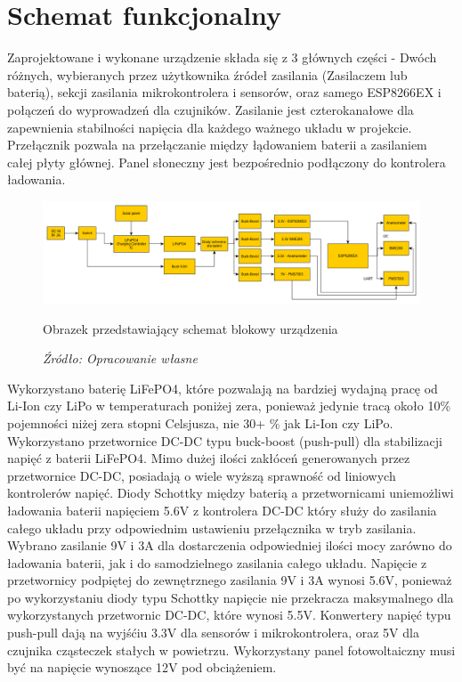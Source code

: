 \documentclass[12pt,a4paper,oneside]{memoir}
\begin{document}
\chapter{Schemat funkcjonalny}
\par Zaprojektowane i wykonane urządzenie składa się z 3 głównych części - Dwóch różnych, wybieranych przez użytkownika źródeł zasilania (Zasilaczem lub baterią), sekcji zasilania mikrokontrolera i sensorów, oraz samego ESP8266EX i połączeń do wyprowadzeń dla czujników. Zasilanie jest czterokanałowe dla zapewnienia stabilności napięcia dla każdego ważnego układu w projekcie. Przełącznik pozwala na przełączanie między łądowaniem baterii a zasilaniem całej płyty głównej. Panel słoneczny jest bezpośrednio podłączony do kontrolera ładowania. 
\begin{figure}[!h]
	\centering
	\includegraphics[scale=0.35]{images/block-schematic.png}
	{\tytulyrozdzialow \footnotesize \caption[Schemat blokowy] {Obrazek przedstawiający schemat blokowy urządzenia}}
	\caption*{\textit{Źródło: Opracowanie własne}}
\end{figure}
\par Wykorzystano baterię LiFePO4, które pozwalają na bardziej wydajną pracę od Li-Ion czy LiPo w temperaturach poniżej zera, ponieważ jedynie tracą około 10\% pojemności niżej zera stopni Celsjusza, nie 30+ \% jak Li-Ion czy LiPo. Wykorzystano przetwornice DC-DC typu buck-boost (push-pull) dla stabilizacji napięć z baterii LiFePO4. Mimo dużej ilości zakłóceń generowanych przez przetwornice DC-DC, posiadają o wiele wyższą sprawność od liniowych kontrolerów napięć. Diody Schottky między baterią a przetwornicami uniemożliwi ładowania baterii napięciem 5.6V z kontrolera DC-DC który służy do zasilania całego układu przy odpowiednim ustawieniu przełącznika w tryb zasilania. Wybrano zasilanie 9V i 3A dla dostarczenia odpowiedniej ilości mocy zarówno do ładowania baterii, jak i do samodzielnego zasilania całego układu. Napięcie z przetwornicy podpiętej do zewnętrznego zasilania 9V i 3A wynosi 5.6V, ponieważ po wykorzystaniu diody typu Schottky napięcie nie przekracza maksymalnego dla wykorzystanych przetwornic DC-DC, które wynosi 5.5V. Konwertery napięć typu push-pull dają na wyjśćiu 3.3V dla sensorów i mikrokontrolera, oraz 5V dla czujnika cząsteczek stałych w powietrzu. Wykorzystany panel fotowoltaiczny musi być na napięcie wynoszące 12V pod obciążeniem.
\newpage
\end{document}
